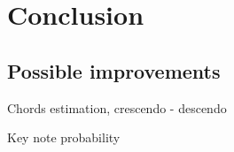 \chapter{Conclusion}\label{ch:conclusion}


\section{Possible improvements}

Chords estimation, crescendo - descendo

Key note probability